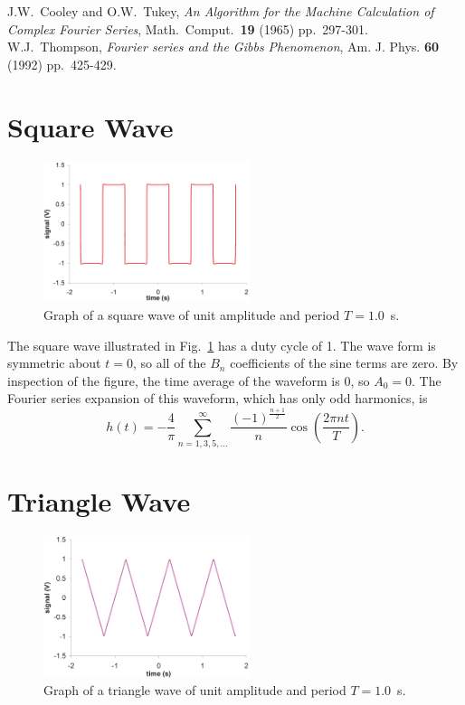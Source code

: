 \documentclass{revtex4}
\begin{document}
%

\begin{thebibliography}{9}

J.W.~Cooley and O.W.~Tukey, {\em An Algorithm for the Machine Calculation of
Complex Fourier Series}, Math.\ Comput.\ {\bf 19} (1965) pp.\ 297-301.
W.J.~Thompson, {\em Fourier series and the Gibbs Phenomenon}, 
Am. J. Phys. {\bf 60} (1992) pp.\ 425-429.

\end{thebibliography}

\appendix

\section{Square Wave}

\begin{figure}
\includegraphics[width=6cm]{sqrwavefig.eps}
\caption{\label{sqrwavefig} 
Graph of a square wave of unit amplitude and period $T=1.0$~s.}
\end{figure}

The square wave illustrated in Fig.~\ref{sqrwavefig} has a duty cycle of
1.  The wave form is symmetric about $t=0$, so all of the $B_n$ coefficients
of the sine terms are zero.  By inspection of the figure, the time average
of the waveform is 0, so $A_0 = 0$. The Fourier series expansion of this
waveform, which has only odd harmonics, is
\begin{equation}
h(t) = -\frac{4}{\pi}\sum_{n=1,3,5,\ldots}^{\infty}
\frac{(-1)^{\frac{n+1}{2}}}{n}\cos\left(\frac{2\pi nt}{T}\right).
\label{eq:sqrwave}
\end{equation}

\section{Triangle Wave}

\begin{figure}
\includegraphics[width=6cm]{triwavefig.eps}
\caption{\label{triwavefig} 
Graph of a triangle wave of unit amplitude and period $T=1.0$~s.}
\end{figure}
\end{document}
